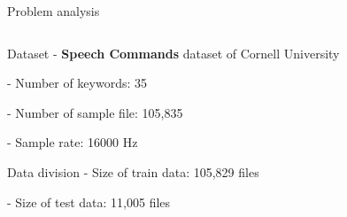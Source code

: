 \begin{frame}{Problem analysis}
\begin{columns}
  \begin{column}{0.7\textwidth}
    \begin{block}{Dataset}
    - \textbf{Speech Commands} dataset of Cornell University

    - Number of keywords: 35

    - Number of sample file: 105,835

    - Sample rate: 16000 Hz
    \end{block}  

    \begin{block}{Data division}
      - Size of train data: 105,829 files

      - Size of test data: 11,005 files
    \end{block}
  \end{column}
  

\end{columns}
\end{frame}
